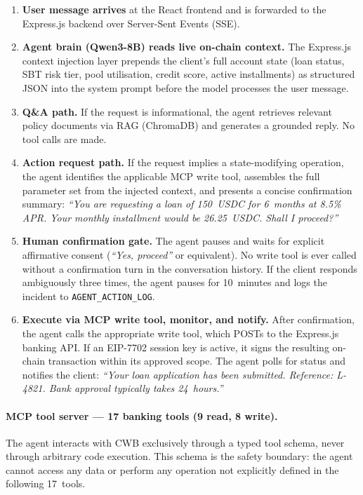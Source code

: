 \documentclass[12pt,a4paper]{report}
\begin{document}
\begin{enumerate}[noitemsep]
\item \textbf{User message arrives} at the React frontend and is forwarded to the Express.js backend over Server-Sent Events (SSE).
\item \textbf{Agent brain (Qwen3-8B) reads live on-chain context.} The Express.js context injection layer prepends the client's full account state (loan status, SBT risk tier, pool utilisation, credit score, active installments) as structured JSON into the system prompt before the model processes the user message.
\item \textbf{Q\&A path.} If the request is informational, the agent retrieves relevant policy documents via RAG (ChromaDB) and generates a grounded reply. No tool calls are made.
\item \textbf{Action request path.} If the request implies a state-modifying operation, the agent identifies the applicable MCP write tool, assembles the full parameter set from the injected context, and presents a concise confirmation summary: \emph{``You are requesting a loan of 150~USDC for 6~months at 8.5\% APR. Your monthly installment would be 26.25~USDC. Shall I proceed?''}
\item \textbf{Human confirmation gate.} The agent pauses and waits for explicit affirmative consent (\emph{``Yes, proceed''} or equivalent). No write tool is ever called without a confirmation turn in the conversation history. If the client responds ambiguously three times, the agent pauses for 10~minutes and logs the incident to \texttt{AGENT\_ACTION\_LOG}.
\item \textbf{Execute via MCP write tool, monitor, and notify.} After confirmation, the agent calls the appropriate write tool, which POSTs to the Express.js banking API. If an EIP-7702 session key is active, it signs the resulting on-chain transaction within its approved scope. The agent polls for status and notifies the client: \emph{``Your loan application has been submitted. Reference: L-4821. Bank approval typically takes 24~hours.''}
\end{enumerate}

\paragraph{MCP tool server --- 17 banking tools (9 read, 8 write).}

The agent interacts with CWB exclusively through a typed tool schema, never through arbitrary code execution. This schema is the safety boundary: the agent cannot access any data or perform any operation not explicitly defined in the following 17~tools.
\end{document}
